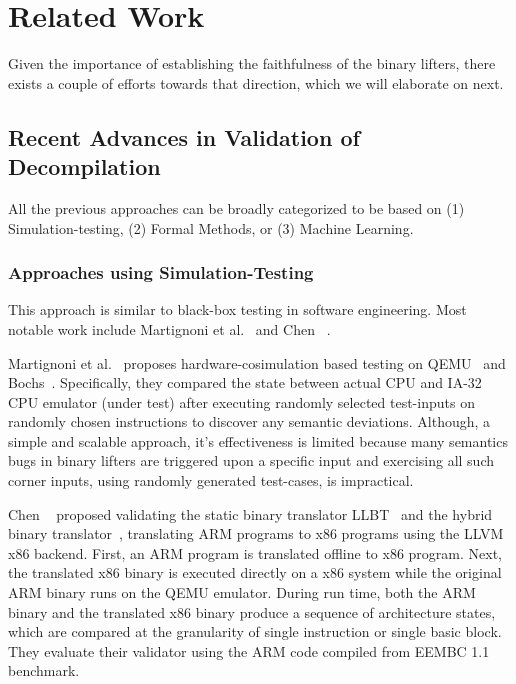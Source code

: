 \chapter{Related Work}\label{sec:related-work}

Given the importance of establishing the faithfulness of the binary lifters,
      there exists a couple of efforts towards that direction, which we will elaborate on next.

\section{Recent Advances in Validation of Decompilation}\label{sec:recent-advances}
All the previous approaches can be broadly categorized to be based on (1)
  Simulation-testing, (2) Formal Methods, or (3) Machine Learning.  

\subsection{Approaches using Simulation-Testing}
This approach is similar to black-box testing in software engineering. Most
notable work include Martignoni et
al.~\cite{Martignoni:ISSTA2009, Martignoni:ISSTA2010,Martignoni:ASPLOS2012} and
Chen \etal~\cite{CLSS2015}.


Martignoni et al.~\cite{Martignoni:ISSTA2009, Martignoni:ISSTA2010} proposes
hardware-cosimulation based testing on QEMU~\cite{QEMU:USENIX05} and
Bochs~\cite{Bochs1996}.  Specifically, they compared the state between actual
CPU and  IA-32 CPU emulator (under test) after executing randomly selected
test-inputs on randomly chosen instructions  to discover any semantic
deviations.
Although, a simple and scalable approach, it's effectiveness is limited because
many semantics bugs in binary lifters are triggered upon a specific input and
exercising all such corner inputs, using randomly generated test-cases, is
impractical.

Chen \etal~\cite{CLSS2015} proposed validating the static binary translator
LLBT~\cite{LLBT2012} and the hybrid binary translator~\cite{LLVMDBT2012},
  translating ARM programs to x86 programs using the LLVM x86 backend. First, an
  ARM program is translated offline to x86 program. Next, the translated x86
  binary is executed  directly on a x86 system while the original ARM binary runs on the QEMU emulator. During run time, both the ARM binary and the
  translated x86 binary produce a sequence of  architecture states, which are
  compared at the granularity of single instruction or single basic block. They evaluate their validator using the ARM code compiled from
  EEMBC 1.1 benchmark. 

